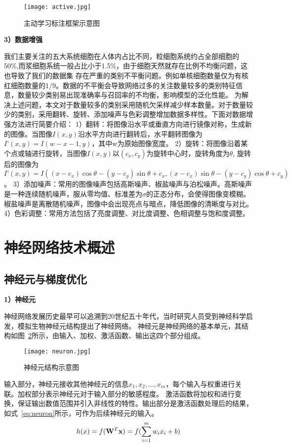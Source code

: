 \begin{figure}[htbp]
  \centering
  \texttt{[image: active.jpg]}
  \caption{主动学习标注框架示意图}
  \label{fig:active}
\end{figure}
\textbf{3）数据增强}

我们主要关注的五大系统细胞在人体内占比不同，粒细胞系统约占全部细胞的50\%,而浆细胞系统一般占比小于1.5\%，由于细胞天然就存在比例不均衡问题，这也导致了我们的数据集
存在严重的类别不平衡问题。例如单核细胞数量仅为有核红细胞数量的1/9。数据的不平衡会导致网络过多的关注数量较多的类别特征信息，数量较少类别易出现准确率与召回率的不均衡，影响模型的泛化性能。
为解决上述问题，本文对于数量较多的类别采用随机欠采样减少样本数量。对于数量较少的类别，采用翻转、旋转、添加噪声与色彩调整增加数据多样性\cite{SWGC202206005}。下面对数据增强\cite{shorten2019survey}方法进行简要介绍：
1）翻转：将图像沿水平或垂直方向进行镜像对称，生成新的图像。当图像$I(x,y)$沿水平方向进行翻转后，水平翻转图像为$I’(x, y)=I(w-x-1,y)$，其中w为原始图像宽度。
2）旋转：将图像沿着某个点或轴进行旋转，当图像$I(x,y)$以$(c_x, c_y)$为旋转中心时，旋转角度为$\theta$, 旋转后的图像为$I’(x, y)=I((x - c_x)\cos\theta - (y - c_y)\sin\theta + c_x, (x - c_x)\sin\theta - (y - c_y)\cos\theta + c_y)$。
3）添加噪声：常用的图像噪声包括高斯噪声、椒盐噪声与泊松噪声。高斯噪声是一种连续随机噪声，服从零均值、标准差为$\sigma$的正态分布，会使得图像变模糊。
椒盐噪声是离散随机噪声，图像中会出现亮点与暗点，降低图像的清晰度与对比。
4）色彩调整：常用方法包括了亮度调整、对比度调整、色相调整与饱和度调整。

\section{神经网络技术概述}
\subsection{神经元与梯度优化}

\textbf{1）神经元}

神经网络发展历史最早可以追溯到20世纪五十年代，当时研究人员受到神经科学启发，模拟生物神经元结构提出了神经网络。
神经元是神经网络的基本单元，其结构如图~\ref{fig:neuron}所示，由输入、加权、激活函数、输出这四个部分组成。
\begin{figure}[htbp]
  \centering
  \texttt{[image: neuron.jpg]}
  \caption{神经元结构示意图}
  \label{fig:neuron}
\end{figure}

输入部分，神经元接收其他神经元的信息$x_1, x_2, \dots, x_m$，每个输入与权重进行关联。加权部分表示神经元对于输入部分的敏感程度。
激活函数将加权和进行变换，保证输出数值范围并引入非线性的特性。输出部分是激活函数处理后的结果，如式~\ref{eq:neuron}所示，可作为后续神经元的输入。
\begin{equation}
  h(x) = f({{\bf{W}}^T}{\bf{x}}) = f(\sum\limits_{i = 1}^m {{w_i}{x_i} + b})
  \label{eq:neuron}
\end{equation}

